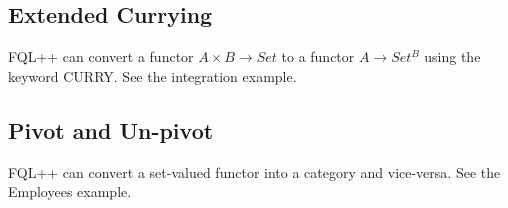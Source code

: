 \documentclass[12pt]{article}
\begin{document}
\subsection{Extended Currying}
 
 FQL++ can convert  a functor $A \times B \to Set$ to a functor $A \to Set^B$ using the keyword CURRY.  See the integration example.
 
 \subsection{Pivot and Un-pivot}
 
 FQL++ can convert a set-valued functor into a category and vice-versa.  See the Employees example.
 
\end{document}

